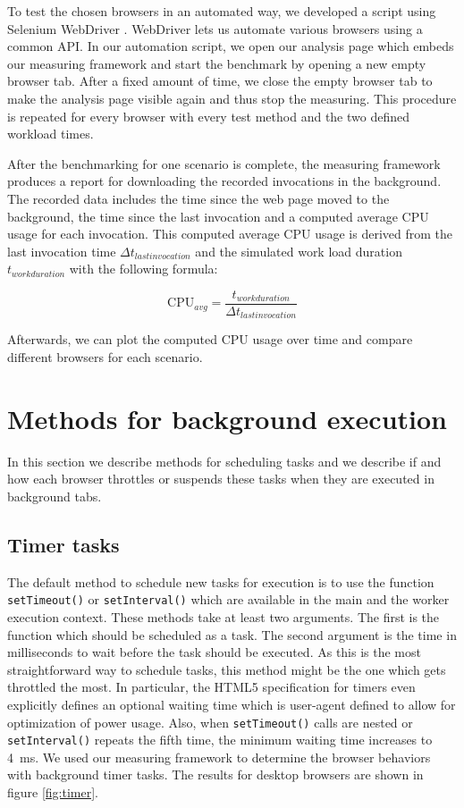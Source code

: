 \documentclass[
	ruledheaders=section,%
	class=report,%
	thesis={type=bachelor},%
	accentcolor=9c,%
	custommargins=true,%
	marginpar=false,%
	parskip=half-,%
	fontsize=11pt,%
]{tudapub}
\begin{document}
  To test the chosen browsers in an automated way, we developed a script using Selenium WebDriver \cite{webdriver}. WebDriver lets us automate various browsers using a common API. In our automation script, we open our analysis page which embeds our measuring framework and start the benchmark by opening a new empty browser tab. After a fixed amount of time, we close the empty browser tab to make the analysis page visible again and thus stop the measuring. This procedure is repeated for every browser with every test method and the two defined workload times.

  After the benchmarking for one scenario is complete, the measuring framework produces a report for downloading the recorded invocations in the background. The recorded data includes the time since the web page moved to the background, the time since the last invocation and a computed average CPU usage for each invocation. This computed average CPU usage is derived from the last invocation time $\Delta t_{last invocation}$ and the simulated work load duration $t_{work duration}$  with the following formula:

  \begin{equation*}
    \text{CPU}_{avg} = \frac{t_{work duration}}{\Delta t_{last invocation}}
  \end{equation*}

  Afterwards, we can plot the computed CPU usage over time and compare different browsers for each scenario.

  \section{Methods for background execution}
  \label{chap:methods}

  In this section we describe methods for scheduling tasks and we describe if and how each browser throttles or suspends these tasks when they are executed in background tabs.
  
  \subsection{Timer tasks}
  \label{sec:timer-tasks}

  The default method to schedule new tasks for execution is to use the function \texttt{setTimeout()} or \texttt{setInterval()} which are available in the main and the worker execution context. These methods take at least two arguments. The first is the function which should be scheduled as a task. The second argument is the time in milliseconds to wait before the task should be executed. As this is the most straightforward way to schedule tasks, this method might be the one which gets throttled the most. In particular, the HTML5 specification for timers \cite{whatwg-timers} even explicitly defines an optional waiting time which is user-agent defined to allow for optimization of power usage. Also, when \texttt{setTimeout()} calls are nested or \texttt{setInterval()} repeats the fifth time, the minimum waiting time increases to 4~ms. We used our measuring framework to determine the browser behaviors with background timer tasks. The results for desktop browsers are shown in figure \ref{fig:timer}.
\end{document}
